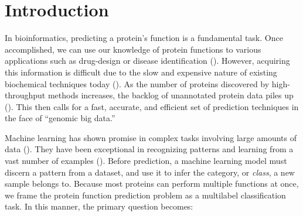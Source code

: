 %
%
%
%
%

\chapter{Introduction}
\label{Introduction}

\par In bioinformatics, predicting a protein's function is a fundamental
task. Once accomplished, we can use our knowledge of protein functions to
various applications such as drug-design or disease identification
(\cite{baldi2001bioinformatics}). However, acquiring this information is
difficult due to the slow and expensive nature of existing biochemical
techniques today (\cite{cozzetto2017computational}). As the number
of proteins discovered by high-throughput methods increases,
the backlog of unannotated protein data piles up (\cite{gaudet2017gene}). This
then calls for a fast, accurate, and efficient set of prediction techniques
in the face of ``genomic big data.''
  
\par Machine learning has shown promise in complex tasks involving large
amounts of data (\cite{chen2014data}). They have been exceptional in
recognizing patterns and learning from a vast number of examples
(\cite{lecun2015deep}). Before prediction, a machine learning model must
discern a pattern from a dataset, and use it to infer the category, or
\textit{class}, a new sample belongs to. Because most proteins can perform
multiple functions at once, we frame the protein function prediction problem
as a multilabel classification task. In this manner, the primary question
becomes:

